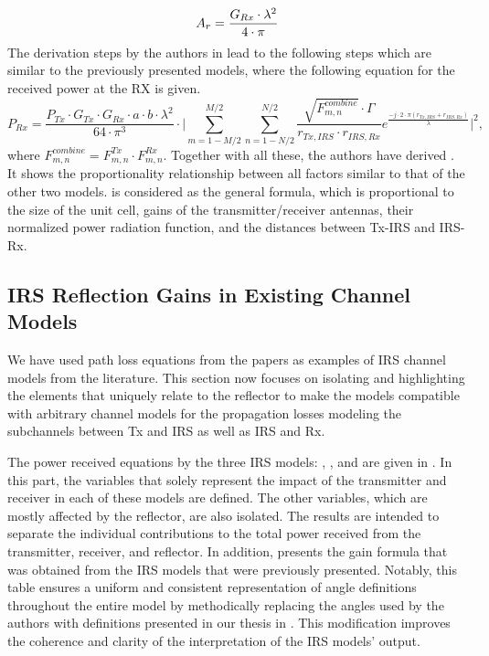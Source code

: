 \begin{equation}
		A_r = \frac{G_{Rx} \cdot \lambda^2}{4 \cdot \pi}\\
\end{equation}
The derivation steps by the authors in \cite{tang2020wireless} lead to the following steps which are similar to the previously presented models, where the following equation for the received power at the RX is given.
\begin{equation} \label{eq:model3 basic equation}
	P_{Rx} = \frac{P_{Tx} \cdot G_{Tx} \cdot G_{Rx} \cdot a \cdot b \cdot \lambda^2}{64 \cdot \pi^3} \cdot \Bigg|\sum_{m=1-M/2}^{M/2} \sum_{n=1-N/2}^{N/2} \frac{\sqrt{F_{m,n}^{combine}} \cdot \Gamma }{r_{Tx, IRS} \cdot r_{IRS, Rx}} e^{\frac{-j \cdot 2 \cdot \pi \left( r_{Tx, IRS} + r_{IRS,Rx} \right) }{\lambda}} \Bigg| ^2 ,
\end{equation}
where $F_{m,n}^{combine}=F_{m,n}^{Tx} \cdot F_{m,n}^{Rx}$. 
Together with all these, the authors have derived  . It shows the proportionality relationship between all factors similar to that of the other two models.  is considered as the general formula, which is proportional to the size of the unit cell, gains of the transmitter/receiver antennas, their normalized power radiation function, and the distances between Tx-IRS and IRS-Rx.
\subsection{IRS Reflection Gains in Existing Channel Models} \label{model gains}
We have used path loss equations from the papers \cite{8936989, ntontin2021optimal, tang2020wireless} as examples of \ac{IRS} channel models from the literature. This section now focuses on isolating and highlighting the elements that uniquely relate to the reflector to make the models compatible with arbitrary channel models for the propagation losses modeling the subchannels between Tx and IRS as well as IRS and Rx.

The power received equations by the three IRS models: , , and  are given in . In this part, the variables that solely represent the impact of the transmitter and receiver in each of these models are defined. The other variables, which are mostly affected by the reflector, are also isolated. The results are intended to separate the individual contributions to the total power received from the transmitter, receiver, and reflector. In addition,  presents the gain formula that was obtained from the IRS models that were previously presented. Notably, this table ensures a uniform and consistent representation of angle definitions throughout the entire model by methodically replacing the angles used by the authors with definitions presented in our thesis in . This modification improves the coherence and clarity of the interpretation of the IRS models' output.

